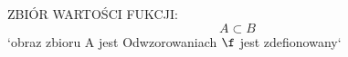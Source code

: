 \documentclass{article}
\begin{document}
ZBIÓR WARTOŚCI FUKCJI:
    \[A \subset B\]
    `obraz zbioru A jest Odwzorowaniach $\f$ jest zdefionowany`
\end{document}
